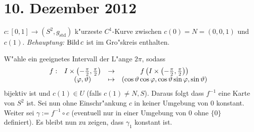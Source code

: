 \section{10. Dezember 2012}
\setcounter{Aufg}{0} %
\setcounter{Loes}{0}

\begin{Loes}
$c: [0,1] \to (S^2, g_{\text{std}})$ k"urzeste $C^1$-Kurve zwischen $c(0) = N = (0,0,1)$ und $c(1)$. \emph{Behauptung:} $\operatorname{Bild} c$ ist im Gro"skreis enthalten.

W"ahle ein geeignetes Intervall der L"ange $2 \pi$, sodass
	\[\begin{array}{cccc} f: & I \times \left( -\frac{\pi}{2}, \frac{\pi}{2} \right) &\to& f \left( I \times \left( -\frac{\pi}{2}, \frac{\pi}{2} \right) \right)\\
		& (\varphi, \vartheta) &\mapsto& (\cos\vartheta \cos\varphi, \cos\vartheta\sin\varphi, \sin\vartheta)\end{array}\]
bijektiv ist und $c(1) \in U$ (falls $c(1) \ne N,S$). Daraus folgt dass $f^{-1}$ eine Karte von $S^2$ ist. Sei nun ohne Einschr"ankung $c$ in keiner Umgebung von $0$ konstant. Weiter sei $\gamma := f^{-1} \circ c$ (eventuell nur in einer Umgebung von $0$ ohne $\{0\}$ definiert). Es bleibt nun zu zeigen, dass $\gamma_1$ konstant ist.


\end{Loes}
